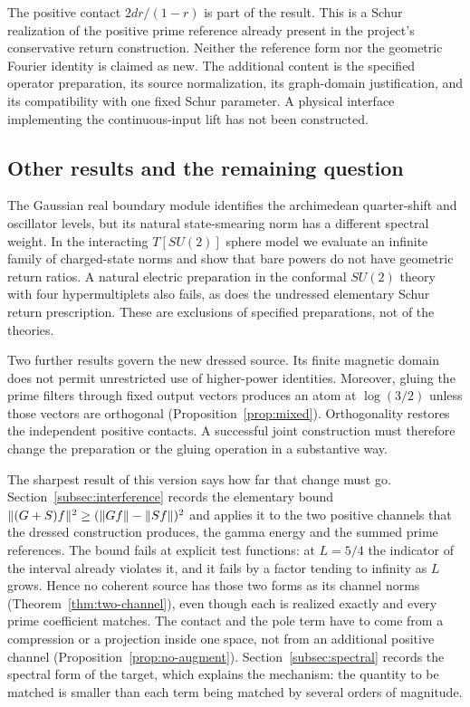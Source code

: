 The positive contact $2dr/(1-r)$ is part of the result. This is a Schur
realization of the positive prime reference already present in the
project's conservative return construction. Neither the reference form
nor the geometric Fourier identity is claimed as new. The additional
content is the specified operator preparation, its source normalization,
its graph-domain justification, and its compatibility with one fixed
Schur parameter. A physical interface implementing the continuous-input
lift has not been constructed.

\subsection{Other results and the remaining question}
The Gaussian real boundary module identifies the archimedean
quarter-shift and oscillator levels, but its natural state-smearing norm
has a different spectral weight. In the interacting $T[SU(2)]$ sphere
model we evaluate an infinite family of charged-state norms and show
that bare powers do not have geometric return ratios. A natural electric
preparation in the conformal $SU(2)$ theory with four hypermultiplets
also fails, as does the undressed elementary Schur return prescription.
These are exclusions of specified preparations, not of the theories.

Two further results govern the new dressed source. Its finite magnetic
domain does not permit unrestricted use of higher-power identities.
Moreover, gluing the prime filters through fixed output vectors produces
an atom at $\log(3/2)$ unless those vectors are orthogonal
(Proposition~\ref{prop:mixed}). Orthogonality restores the independent
positive contacts. A successful joint construction must therefore change
the preparation or the gluing operation in a substantive way.

The sharpest result of this version says how far that change must go.
Section~\ref{subsec:interference} records the elementary bound
$\lVert (G+S)f\rVert^2\geq(\lVert Gf\rVert-\lVert Sf\rVert)^2$ and applies it to the two
positive channels that the dressed construction produces, the gamma energy
and the summed prime references. The bound fails at explicit test functions:
at $L=5/4$ the indicator of the interval already violates it, and it fails
by a factor tending to infinity as $L$ grows. Hence no coherent source has
those two forms as its channel norms (Theorem~\ref{thm:two-channel}), even
though each is realized exactly and every prime coefficient matches. The
contact and the pole term have to come from a compression or a projection
inside one space, not from an additional positive channel
(Proposition~\ref{prop:no-augment}). Section~\ref{subsec:spectral} records
the spectral form of the target, which explains the mechanism: the quantity
to be matched is smaller than each term being matched by several orders of
magnitude.

